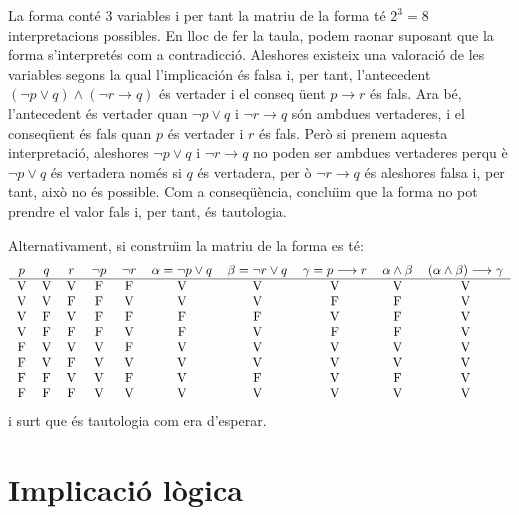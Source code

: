 \begin{solucio}
La forma cont\'{e} 3 variables i per tant la matriu de la forma t\'{e} $%
2^{3}=8$ interpretacions possibles. En lloc de fer la taula, podem raonar
suposant que la forma s'interpret\'{e}s com a contradicci\'{o}. Aleshores
existeix una valoraci\'{o} de les variables segons la qual l'implicaci\'{o}n
\'{e}s falsa i, per tant, l'antecedent $\left( \lnot p\vee q\right)
\wedge\left( \lnot r\longrightarrow q\right) $ \'{e}s vertader i el conseq%
\"{u}ent $p\longrightarrow r$ \'{e}s fals. Ara b\'{e}, l'antecedent \'{e}s
vertader quan $\lnot p\vee q$ i $\lnot r\longrightarrow q$ s\'{o}n ambdues
vertaderes, i el conseq\"{u}ent \'{e}s fals quan $p$ \'{e}s vertader i $r$
\'{e}s fals. Per\`{o} si prenem aquesta interpretaci\'{o}, aleshores $\lnot
p\vee q$ i $\lnot r\longrightarrow q$ no poden ser ambdues vertaderes perqu%
\`{e} $\lnot p\vee q$ \'{e}s vertadera nom\'{e}s si $q$ \'{e}s vertadera, per%
\`{o} $\lnot r\longrightarrow q$ \'{e}s aleshores falsa i, per tant, aix\`{o}
no \'{e}s possible. Com a conseq\"{u}\`{e}ncia, conclu\"{\i}m que la forma
no pot prendre el valor fals i, per tant, \'{e}s tautologia.

Alternativament, si constru\"{\i}m la matriu de la forma es t\'{e}:%
\begin{equation*}
\begin{tabular}{cccccccccc}
$p$ & $q$ & $r$ & $\lnot p$ & $\lnot r$ & $\alpha=\lnot p\vee q$ & $%
\beta=\lnot r\vee q$ & $\gamma=p\longrightarrow r$ & $\alpha\wedge\beta$ & $%
\left( \alpha\wedge\beta\right) \longrightarrow\gamma$ \\ \hline
V & V & V & F & F & V & V & V & V & V \\
V & V & F & F & V & V & V & F & F & V \\
V & F & V & F & F & F & F & V & F & V \\
V & F & F & F & V & F & V & F & F & V \\
F & V & V & V & F & V & V & V & V & V \\
F & V & F & V & V & V & V & V & V & V \\
F & F & V & V & F & V & F & V & F & V \\
F & F & F & V & V & V & V & V & V & V%
\end{tabular}
\end{equation*}
i surt que \'{e}s tautologia com era d'esperar.
\end{solucio}

\section{Implicaci\'{o} l\`{o}gica\label{1}}

